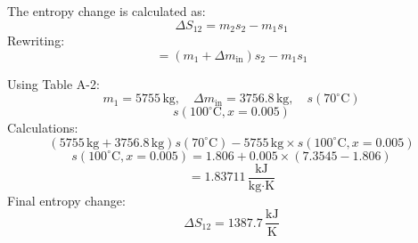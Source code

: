 The entropy change is calculated as:  
\[
\Delta S_{12} = m_2 s_2 - m_1 s_1
\]  
Rewriting:  
\[
= (m_1 + \Delta m_{\text{in}}) s_2 - m_1 s_1
\]  

Using Table A-2:  
\[
m_1 = 5755 \, \text{kg}, \quad \Delta m_{\text{in}} = 3756.8 \, \text{kg}, \quad s(70^\circ\text{C})
\]  
\[
s(100^\circ\text{C}, x=0.005)
\]  
Calculations:  
\[
(5755 \, \text{kg} + 3756.8 \, \text{kg}) s(70^\circ\text{C}) - 5755 \, \text{kg} \times s(100^\circ\text{C}, x=0.005)
\]  
\[
s(100^\circ\text{C}, x=0.005) = 1.806 + 0.005 \times (7.3545 - 1.806)
\]  
\[
= 1.83711 \, \frac{\text{kJ}}{\text{kg·K}}
\]  
Final entropy change:  
\[
\Delta S_{12} = 1387.7 \, \frac{\text{kJ}}{\text{K}}
\]